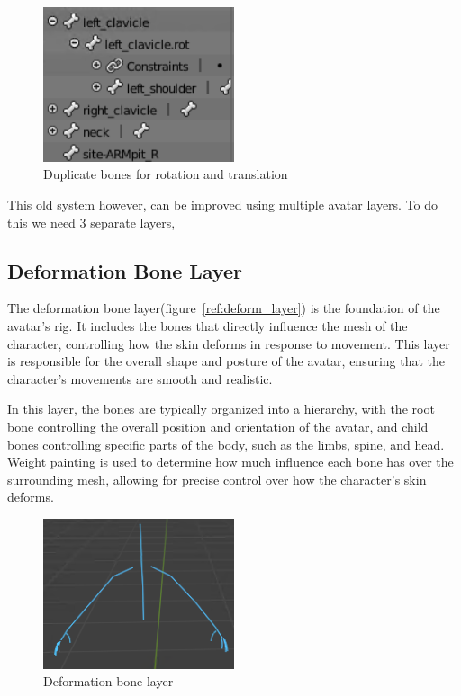 \documentclass[../../main.tex]{subfiles}
\begin{document}
\begin{figure}
    \centering
    \includegraphics[width=0.5\textwidth]{chapters/rigging_layers/images/old_bone_structure.png}
    \caption{Duplicate bones for rotation and translation}
    \label{fig:old_bone_structure}
\end{figure}

This old system however, can be improved using multiple avatar layers. To do this we need 3 separate layers,

\subsection{Deformation Bone Layer}
\label{ch:rigging_layers:proc_rig_signing_avatars:deform_bone_layer}

The deformation bone layer(figure~\ref{ref:deform_layer}) is the foundation of the avatar's rig. It includes the bones that directly influence the mesh of the character, controlling how the skin deforms in response to movement. This layer is responsible for the overall shape and posture of the avatar, ensuring that the character's movements are smooth and realistic.

In this layer, the bones are typically organized into a hierarchy, with the root bone controlling the overall position and orientation of the avatar, and child bones controlling specific parts of the body, such as the limbs, spine, and head. Weight painting is used to determine how much influence each bone has over the surrounding mesh, allowing for precise control over how the character's skin deforms.

\begin{figure}
    \centering
    \includegraphics[width=0.5\textwidth]{chapters/rigging_layers/images/deform_layer.png}
    \caption{Deformation bone layer}
    \label{fig:deform_layer}
\end{figure}
\end{document}
